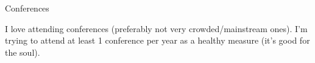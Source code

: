 \documentclass{resume} %
\begin{document}
\begin{rSection}{Conferences}

  I love attending conferences (preferably not very crowded/mainstream
  ones). I'm trying to attend at least 1 conference per year as a
  healthy measure (it's good for the soul).


\end{rSection}
\end{document}
